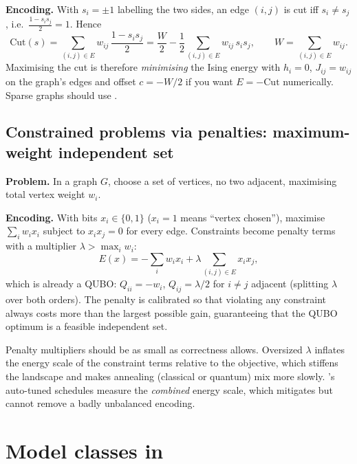 \textbf{Encoding.} With $s_i=\pm1$ labelling the two sides, an edge $(i,j)$
is cut iff $s_i\neq s_j$, i.e.\ $\tfrac{1-s_is_j}{2}=1$. Hence
\begin{equation}
\mathrm{Cut}(s)=\sum_{(i,j)\in E} w_{ij}\,\frac{1-s_is_j}{2}
=\frac{W}{2}-\frac12\sum_{(i,j)\in E} w_{ij}\,s_is_j,
\qquad W=\sum_{(i,j)\in E}w_{ij}.
\end{equation}
Maximising the cut is therefore \emph{minimising} the Ising energy with
$h_i=0$, $J_{ij}=w_{ij}$ on the graph's edges and offset $c=-W/2$ if you want
$E=-\mathrm{Cut}$ numerically. Sparse graphs should use .

\subsection{Constrained problems via penalties: maximum-weight independent set}
\label{sec:mwis}

\textbf{Problem.} In a graph $G$, choose a set of vertices, no two adjacent,
maximising total vertex weight $w_i$.

\textbf{Encoding.} With bits $x_i\in\{0,1\}$ ($x_i=1$ means ``vertex chosen''),
maximise $\sum_i w_ix_i$ subject to $x_ix_j=0$ for every edge. Constraints
become penalty terms with a multiplier $\lambda>\max_i w_i$:
\begin{equation}
E(x)= -\sum_i w_i x_i + \lambda\sum_{(i,j)\in E} x_i x_j ,
\end{equation}
which is already a QUBO: $Q_{ii}=-w_i$, $Q_{ij}=\lambda/2$ for
$i\ne j$ adjacent (splitting $\lambda$ over both orders). The penalty is
calibrated so that violating any constraint always costs more than the
largest possible gain, guaranteeing that the QUBO optimum is a feasible
independent set.

\begin{warnbox}
Penalty multipliers should be as small as correctness allows. Oversized
$\lambda$ inflates the energy scale of the constraint terms relative to the
objective, which stiffens the landscape and makes annealing (classical or
quantum) mix more slowly. \qv's auto-tuned schedules measure the
\emph{combined} energy scale, which mitigates but cannot remove a badly
unbalanced encoding.
\end{warnbox}

\section{Model classes in \qv}
\label{sec:models}

